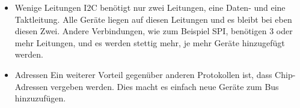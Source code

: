 \begin{itemize}
\item Wenige Leitungen \newline
I2C benötigt nur zwei Leitungen, eine Daten- und eine Taktleitung. Alle Geräte liegen auf diesen Leitungen und es bleibt bei eben diesen Zwei. \newline
Andere Verbindungen, wie zum Beispiel SPI, benötigen 3 oder mehr Leitungen, und es werden stettig mehr, je mehr Geräte hinzugefügt werden.

\item Adressen \newline
Ein weiterer Vorteil gegenüber anderen Protokollen ist, dass Chip-Adressen vergeben werden. Dies macht es einfach neue Geräte zum Bus hinzuzufügen.
\end{itemize}

\clearpage %
